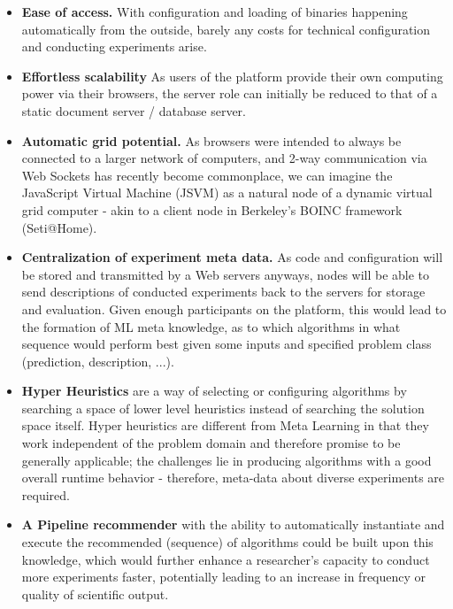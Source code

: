 \begin{itemize}
	\item \textbf{Ease of access.} With configuration and loading of binaries happening automatically from the outside, barely any costs for technical configuration and conducting experiments arise.
	
	\item \textbf{Effortless scalability} As users of the platform provide their own computing power via their browsers, the server role can initially be reduced to that of a static document server / database server.
	
	\item \textbf{Automatic grid potential.} As browsers were intended to always be connected to a larger network of computers, and 2-way communication via Web Sockets has recently become commonplace, we can imagine the JavaScript Virtual Machine (JSVM) as a natural node of a dynamic virtual grid computer - akin to a client node in Berkeley's BOINC framework (Seti@Home).
	
	\item \textbf{Centralization of experiment meta data.} As code and configuration will be stored and transmitted by a Web servers anyways, nodes will be able to send descriptions of conducted experiments back to the servers for storage and evaluation. Given enough participants on the platform, this would lead to the formation of ML meta knowledge, as to which algorithms in what sequence would perform best given some inputs and specified problem class (prediction, description, ...).
	
	\item \textbf{Hyper Heuristics} are a way of selecting or configuring algorithms by searching a space of lower level heuristics instead of searching the solution space itself. Hyper heuristics are different from Meta Learning in that they work independent of the problem domain and therefore promise to be generally applicable; the challenges lie in producing algorithms with a good overall runtime behavior - therefore, meta-data about diverse experiments are required.
	
	\item \textbf{A Pipeline recommender} with the ability to automatically instantiate and execute the recommended (sequence) of algorithms could be built upon this knowledge, which would further enhance a researcher's capacity to conduct more experiments faster, potentially leading to an increase in frequency or quality of scientific output.
	

\end{itemize}

